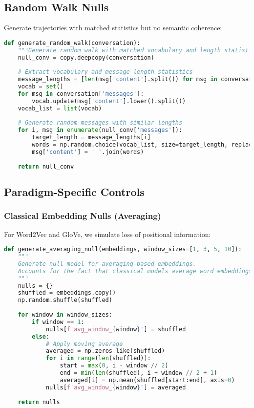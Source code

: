 \documentclass[11pt,letterpaper]{article}
\begin{document}
\subsection{Random Walk Nulls}

Generate trajectories with matched statistics but no semantic coherence:

\begin{lstlisting}[language=Python]
def generate_random_walk(conversation):
    """Generate random walk with matched vocabulary and length statistics."""
    null_conv = copy.deepcopy(conversation)
    
    # Extract vocabulary and message length statistics
    message_lengths = [len(msg['content'].split()) for msg in conversation['messages']]
    vocab = set()
    for msg in conversation['messages']:
        vocab.update(msg['content'].lower().split())
    vocab_list = list(vocab)
    
    # Generate random messages with similar lengths
    for i, msg in enumerate(null_conv['messages']):
        target_length = message_lengths[i]
        words = np.random.choice(vocab_list, size=target_length, replace=True)
        msg['content'] = ' '.join(words)
    
    return null_conv
\end{lstlisting}

\subsection{Paradigm-Specific Controls}

\subsubsection{Classical Embedding Nulls (Averaging)}

For Word2Vec and GloVe, we simulate loss of positional information:

\begin{lstlisting}[language=Python]
def generate_averaging_null(embeddings, window_sizes=[1, 3, 5, 10]):
    """
    Generate null model for averaging-based embeddings.
    Accounts for the fact that classical models average word embeddings.
    """
    nulls = {}
    shuffled = embeddings.copy()
    np.random.shuffle(shuffled)
    
    for window in window_sizes:
        if window == 1:
            nulls[f'avg_window_{window}'] = shuffled
        else:
            # Apply moving average
            averaged = np.zeros_like(shuffled)
            for i in range(len(shuffled)):
                start = max(0, i - window // 2)
                end = min(len(shuffled), i + window // 2 + 1)
                averaged[i] = np.mean(shuffled[start:end], axis=0)
            nulls[f'avg_window_{window}'] = averaged
    
    return nulls
\end{lstlisting}
\end{document}
